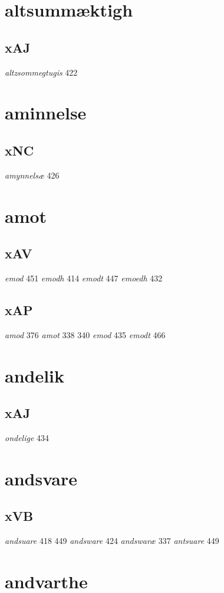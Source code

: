 \documentclass[a4paper,twocolumn]{article}
\begin{document}
\section{altsummæktigh}
\label{sec:org0adf59e}
\subsection{xAJ}
\label{sec:orgfda3d03}
\emph{altzsommegtugis} 422 
\section{aminnelse}
\label{sec:org6d3aaf5}
\subsection{xNC}
\label{sec:org0484670}
\emph{amynnelsæ} 426 
\section{amot}
\label{sec:orgd2b484e}
\subsection{xAV}
\label{sec:org7941325}
\emph{emod} 451 \emph{emodh} 414 \emph{emodt} 447 \emph{emoedh} 432 
\subsection{xAP}
\label{sec:org3ad757d}
\emph{amod} 376 \emph{amot} 338 340 \emph{emod} 435 \emph{emodt} 466 
\section{andelik}
\label{sec:org05e3963}
\subsection{xAJ}
\label{sec:orgef7d9df}
\emph{ondelige} 434 
\section{andsvare}
\label{sec:org57a500d}
\subsection{xVB}
\label{sec:orge74245a}
\emph{andsuare} 418 449 \emph{andsware} 424 \emph{andswaræ} 337 \emph{antsuare} 449 
\section{andvarthe}
\label{sec:org03db7bd}
\end{document}
